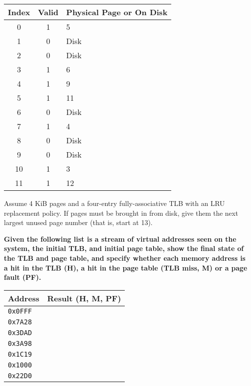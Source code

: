 \documentclass{exam}
\begin{document}
\begin{questions}
\begin{multicols}{2}
        \begin{tabular}{|c|c|l|}
            \hline
            \textbf{Index} & \textbf{Valid} & \textbf{Physical Page or On Disk} \\
            \hline
            0 & 1 & 5 \\
            \hline
            1 & 0 & Disk \\
            \hline
            2 & 0 & Disk \\
            \hline
            3 & 1 & 6 \\
            \hline
            4 & 1 & 9 \\
            \hline
            5 & 1 & 11 \\
            \hline
            6 & 0 & Disk \\
            \hline
            7 & 1 & 4 \\
            \hline
            8 & 0 & Disk \\
            \hline
            9 & 0 & Disk \\
            \hline
            10 & 1 & 3 \\
            \hline
            11 & 1 & 12 \\
            \hline
        \end{tabular}
    \end{multicols}

    Assume 4 KiB pages and a four-entry fully-associative TLB with an LRU
    replacement policy. If pages must be brought in from disk, give them the
    next largest unused page number (that is, start at 13).

    \textbf{Given the following list is a stream of virtual addresses seen on
    the system, the initial TLB, and initial page table, show the final state of
    the TLB and page table, and specify whether each memory address is a hit in
    the TLB (H), a hit in the page table (TLB miss, M) or a page fault (PF).}

    \begin{multicols}{2}
        \def\arraystretch{1.5}%
        \begin{tabular}{|l|l|}
            \hline
            \textbf{Address} & \textbf{Result (H, M, PF)} \\
            \hline
            \texttt{0x0FFF} & \\
            \hline
            \texttt{0x7A28} & \\
            \hline
            \texttt{0x3DAD} & \\
            \hline
            \texttt{0x3A98} & \\
            \hline
            \texttt{0x1C19} & \\
            \hline
            \texttt{0x1000} & \\
            \hline
            \texttt{0x22D0} & \\
            \hline
        \end{tabular}


\end{multicols}
\end{questions}
\end{document}
